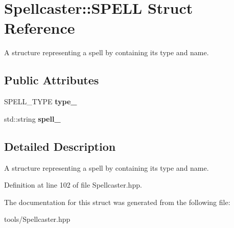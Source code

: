\hypertarget{struct_spellcaster_1_1_s_p_e_l_l}{}\section{Spellcaster\+:\+:S\+P\+E\+LL Struct Reference}
\label{struct_spellcaster_1_1_s_p_e_l_l}


A structure representing a spell by containing it\textquotesingle{}s type and name.  


\subsection*{Public Attributes}
\begin{DoxyCompactItemize}
\item 
S\+P\+E\+L\+L\+\_\+\+T\+Y\+PE {\bfseries type\+\_\+}\hypertarget{struct_spellcaster_1_1_s_p_e_l_l_ad313aa994f76d1a79ab488bdfb9cfb40}{}\label{struct_spellcaster_1_1_s_p_e_l_l_ad313aa994f76d1a79ab488bdfb9cfb40}

\item 
std\+::string {\bfseries spell\+\_\+}\hypertarget{struct_spellcaster_1_1_s_p_e_l_l_a5400b8662abb37ffc648278bb5b07b93}{}\label{struct_spellcaster_1_1_s_p_e_l_l_a5400b8662abb37ffc648278bb5b07b93}

\end{DoxyCompactItemize}


\subsection{Detailed Description}
A structure representing a spell by containing it\textquotesingle{}s type and name. 

Definition at line 102 of file Spellcaster.\+hpp.



The documentation for this struct was generated from the following file\+:\begin{DoxyCompactItemize}
\item 
tools/Spellcaster.\+hpp\end{DoxyCompactItemize}
